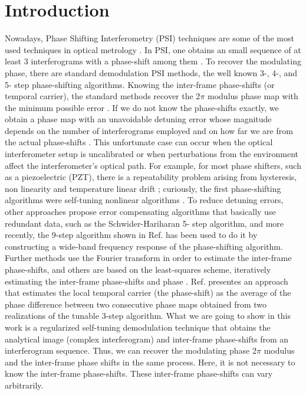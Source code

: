 \documentclass[letterpaper,12pt]{article}   %
\begin{document}
\section{Introduction}
Nowadays, Phase Shifting Interferometry (PSI) techniques are some of the most used techniques in optical metrology \cite{a1_OpticalTesting}. In PSI, one obtains an small sequence of at least 3 interferograms with a phase-shift among them \cite{a1_OpticalTesting}. To recover the modulating phase, there are standard demodulation PSI methods, the well known 3-, 4-, and 5- step phase-shifting algorithms. Knowing the inter-frame phase-shifts (or temporal carrier), the standard methods recover the 2$\pi$ modulus phase map with the minimum possible error \cite{a1_OpticalTesting,a2_F&K,a3}. If we do not know the phase-shifts exactly, we obtain a phase map with an unavoidable detuning error whose magnitude depends on the number of interferograms employed and on how far we are from the actual phase-shifts \cite{a3,a4,a5,a6}. This unfortunate case can occur when the optical interferometer setup is uncalibrated or when perturbations from the environment affect the interferometer's optical path. For example, for most phase shifters, such as a piezoelectric (PZT), there is a repeatability problem arising from hysteresis, non linearity and temperature linear drift \cite{a5,a7}; curiously, the first phase-shifting algorithms were self-tuning nonlinear algorithms \cite{a8,a9}. To reduce detuning errors, other approaches propose error compensating algorithms that basically use redundant data, such as the Schwider-Hariharan 5- step algorithm, \cite{a4,a10,a11} and more recently, the 9-step algorithm shown in Ref. \cite{a12} has been used to do it by constructing a wide-band frequency response of the phase-shifting algorithm. Further methods use the Fourier transform in order to estimate the inter-frame phase-shifts, and others are based on the least-squares scheme, iteratively estimating the inter-frame phase-shifts and phase \cite{a13,a14}. Ref. \cite{a16} presentes an approach that estimates the local temporal carrier (the phase-shift) as the average of the phase difference between two consecutive phase maps obtained from two realizations of the tunable 3-step algorithm. What we are going to show in this work is a regularized self-tuning demodulation technique that obtains the analytical image (complex interferogram) and inter-frame phase-shifts from an interferogram sequence. Thus, we can recover the modulating phase 2$\pi$ modulus and the inter-frame phase shifts in the same process. Here, it is not necessary to know the inter-frame phase-shifts. These inter-frame phase-shifts can vary arbitrarily.
\end{document}
